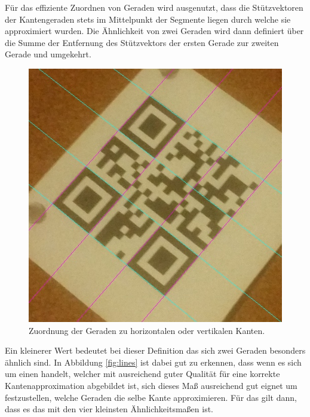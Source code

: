 Für das effiziente Zuordnen von Geraden wird ausgenutzt, dass die Stützvektoren der Kantengeraden stets im Mittelpunkt der Segmente liegen durch welche sie approximiert wurden. Die Ähnlichkeit von zwei Geraden wird dann definiert über die Summe der Entfernung des Stützvektors der ersten Gerade zur zweiten Gerade und umgekehrt.


\begin{figure}
  \vspace{-20pt}
  \begin{center}
    \includegraphics[scale=0.25]{images/qrcode-adler-wand_6___SPLIT___0_.jpg}
  \end{center}
  \vspace{-10pt}
  \caption{Zuordnung der Geraden zu horizontalen oder vertikalen Kanten.}
  \vspace{-10pt}
\end{figure}

Ein kleinerer Wert bedeutet bei dieser Definition das sich zwei Geraden besonders ähnlich sind. In Abbildung \ref{fig:lines} ist dabei gut zu erkennen, dass wenn es sich um einen \QRCode handelt, welcher mit ausreichend guter Qualität für eine korrekte Kantenapproximation abgebildet ist, sich dieses Maß ausreichend gut eignet um festzustellen, welche Geraden die selbe Kante approximieren. Für das \olfp gilt dann, dass es das \fp mit den vier kleinsten Ähnlichkeitsmaßen ist.

